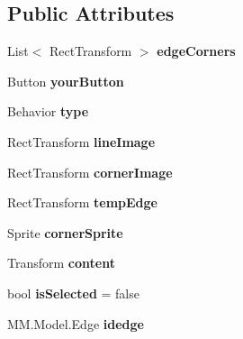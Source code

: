 \subsection*{Public Attributes}
\begin{DoxyCompactItemize}
\item 
\mbox{\label{class_select_edge_button_ad8091eded4e5867a05a3d8ca5661986c}} 
List$<$ Rect\+Transform $>$ {\bfseries edge\+Corners}
\item 
\mbox{\label{class_select_edge_button_aa266ecdd7eaa7905573c9ea51672c346}} 
Button {\bfseries your\+Button}
\item 
\mbox{\label{class_select_edge_button_a61a55560653b35c10c98a23d76752218}} 
Behavior {\bfseries type}
\item 
\mbox{\label{class_select_edge_button_a7e39634ae2b028aec4dedcf870423a7d}} 
Rect\+Transform {\bfseries line\+Image}
\item 
\mbox{\label{class_select_edge_button_adb4a2fb2758a17b836baf88968e30ba5}} 
Rect\+Transform {\bfseries corner\+Image}
\item 
\mbox{\label{class_select_edge_button_afe01a333d58c771cd8d5b04b6c68c24d}} 
Rect\+Transform {\bfseries temp\+Edge}
\item 
\mbox{\label{class_select_edge_button_add0fdd522d721462d82dc29803b00c51}} 
Sprite {\bfseries corner\+Sprite}
\item 
\mbox{\label{class_select_edge_button_a52992d67a442bc9b14b6628fbfa6fd16}} 
Transform {\bfseries content}
\item 
\mbox{\label{class_select_edge_button_a5bad131a282de8f14427fa3a3e93e588}} 
bool {\bfseries is\+Selected} = false
\item 
\mbox{\label{class_select_edge_button_a068915d3ba018eb2c831bd727be5b2ea}} 
M\+M.\+Model.\+Edge {\bfseries idedge}
\item 

\end{DoxyCompactItemize}
